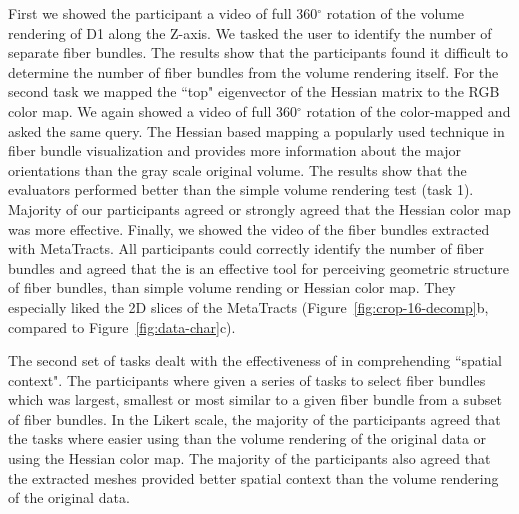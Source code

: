 
First we showed the participant a video of full 360{$^\circ$} rotation of the volume rendering of D1 along the Z-axis. We tasked the user to identify the number of separate fiber bundles. The results show that the participants found it difficult to determine the number of fiber bundles from the volume rendering itself. For the second task we mapped the ``top" eigenvector of the Hessian matrix to the RGB color map. We again showed a video of full 360{$^\circ$} rotation of the color-mapped and asked the same query. The Hessian based mapping a popularly used technique in fiber bundle visualization and provides more information about the major orientations than the  gray scale original volume. The results show that the evaluators performed better than the simple volume rendering test (task 1). Majority of our participants agreed or strongly agreed that the Hessian color map was more effective. Finally, we showed the video of the fiber bundles extracted with MetaTracts. 
All participants could correctly identify the number of fiber bundles and agreed that the \mt  is an effective tool for perceiving geometric structure  of fiber bundles, than simple volume rending or Hessian color map. They especially liked the 2D slices of the MetaTracts (Figure~\ref{fig:crop-16-decomp}b, compared to Figure~\ref{fig:data-char}c).

The second set of tasks dealt with the effectiveness of \mt in comprehending ``spatial context".
The participants where given a series of tasks to select fiber bundles which was largest, smallest or most similar to a given fiber bundle from a subset of fiber bundles. In the Likert scale, the majority of the participants agreed that the tasks where easier using \mt than the volume rendering of the original data or using the Hessian color map. 
The majority of the participants also agreed that the extracted meshes provided better spatial context than the volume rendering of the original data. 
